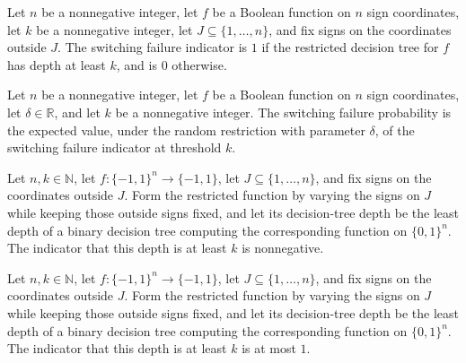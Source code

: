 \begin{definition}
\label{FABL.switchingFailureIndicator}
\leanok
{}
Let $n$ be a nonnegative integer, let $f$ be a Boolean function on $n$ sign coordinates,
let $k$ be a nonnegative integer, let $J\subseteq\{1,\ldots,n\}$, and fix signs on
the coordinates outside $J$. The switching failure indicator is $1$ if the restricted
decision tree for $f$ has depth at least $k$, and is $0$ otherwise.
\end{definition}

\begin{definition}
\label{FABL.switchingFailureProbability}
\leanok
{}
Let $n$ be a nonnegative integer, let $f$ be a Boolean function on $n$ sign coordinates,
let $\delta\in\mathbb R$, and let $k$ be a nonnegative integer. The switching failure
probability is the expected value, under the random restriction with parameter
$\delta$, of the switching failure indicator at threshold $k$.
\end{definition}

\begin{theorem}
\label{FABL.switchingFailureIndicator_nonneg}
\leanok
{}
Let $n,k\in\mathbb N$, let $f:\{−1,1\}^n\to\{−1,1\}$, let $J\subseteq\{1,\ldots,n\}$,
and fix signs on the coordinates outside $J$. Form the restricted function by varying
the signs on $J$ while keeping those outside signs fixed, and let its decision-tree
depth be the least depth of a binary decision tree computing the corresponding function
on $\{0,1\}^n$. The indicator that this depth is at least $k$ is nonnegative.
\end{theorem}

\begin{theorem}
\label{FABL.switchingFailureIndicator_le_one}
\leanok
{}
Let $n,k\in\mathbb N$, let $f:\{−1,1\}^n\to\{−1,1\}$, let $J\subseteq\{1,\ldots,n\}$,
and fix signs on the coordinates outside $J$. Form the restricted function by varying
the signs on $J$ while keeping those outside signs fixed, and let its decision-tree
depth be the least depth of a binary decision tree computing the corresponding function
on $\{0,1\}^n$. The indicator that this depth is at least $k$ is at most $1$.
\end{theorem}

